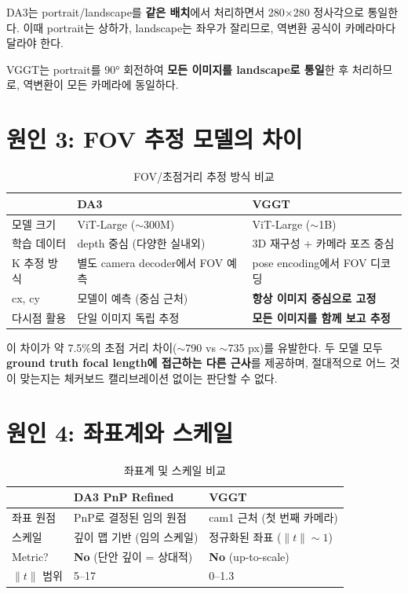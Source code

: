 \documentclass[11pt, a4paper]{report}
\begin{document}
\begin{keyidea}[title={핵심 차이}]
DA3는 portrait/landscape를 \textbf{같은 배치}에서 처리하면서 280$\times$280 정사각으로 통일한다.
이때 portrait는 상하가, landscape는 좌우가 잘리므로, 역변환 공식이 카메라마다 달라야 한다.

VGGT는 portrait를 90° 회전하여 \textbf{모든 이미지를 landscape로 통일}한 후 처리하므로,
역변환이 모든 카메라에 동일하다.
\end{keyidea}


\section{원인 3: FOV 추정 모델의 차이}

\begin{table}[H]
\centering
\caption{FOV/초점거리 추정 방식 비교}
\renewcommand{\arraystretch}{1.3}
\begin{tabular}{l p{6cm} p{6cm}}
\toprule
& \textbf{DA3} & \textbf{VGGT} \\
\midrule
모델 크기 & ViT-Large ($\sim$300M) & ViT-Large ($\sim$1B) \\
학습 데이터 & depth 중심 (다양한 실내외) & 3D 재구성 + 카메라 포즈 중심 \\
K 추정 방식 & 별도 camera decoder에서 FOV 예측 & pose encoding에서 FOV 디코딩 \\
cx, cy & 모델이 예측 (중심 근처) & \textbf{항상 이미지 중심으로 고정} \\
다시점 활용 & 단일 이미지 독립 추정 & \textbf{모든 이미지를 함께 보고 추정} \\
\bottomrule
\end{tabular}
\end{table}

이 차이가 약 7.5\%의 초점 거리 차이($\sim$790 vs $\sim$735 px)를 유발한다. 두 모델 모두 \textbf{ground truth focal length에 접근하는 다른 근사}를 제공하며, 절대적으로 어느 것이 맞는지는 체커보드 캘리브레이션 없이는 판단할 수 없다.


\section{원인 4: 좌표계와 스케일}

\begin{table}[H]
\centering
\caption{좌표계 및 스케일 비교}
\renewcommand{\arraystretch}{1.3}
\begin{tabular}{l p{6cm} p{6cm}}
\toprule
& \textbf{DA3 PnP Refined} & \textbf{VGGT} \\
\midrule
좌표 원점 & PnP로 결정된 임의 원점 & cam1 근처 (첫 번째 카메라) \\
스케일 & 깊이 맵 기반 (임의 스케일) & 정규화된 좌표 ($\|t\| \sim 1$) \\
Metric? & \textbf{No} (단안 깊이 = 상대적) & \textbf{No} (up-to-scale) \\
\midrule
$\|t\|$ 범위 & 5--17 & 0--1.3 \\
\bottomrule
\end{tabular}
\end{table}
\end{document}

